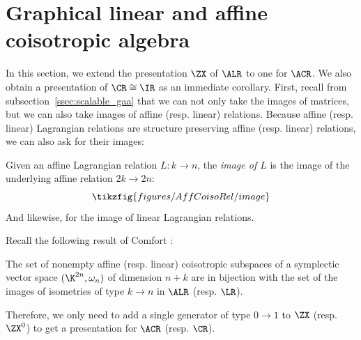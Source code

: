 \section{Graphical linear and affine coisotropic algebra}\label{sec:AffCoisoRel}
In this section, we extend the presentation \(\ZX\) of \(\ALR\) to one for  \(\ACR\).  We also obtain a presentation of \(\CR\cong\IR\) as an immediate corollary. 
First, recall from subsection~\ref{ssec:scalable_gaa} that we can not only take the images of matrices, but we can also take images of affine (resp. linear) relations.  Because affine (resp. linear) Lagrangian relations are structure preserving affine (resp. linear) relations, we can also ask for their images:
\begin{definition}
  Given an affine Lagrangian relation \(L:k\to n\), the {\em image of \(L\)} is the image of the underlying affine relation \(2k\to 2n\):
  \[\tikzfig{figures/AffCoisoRel/image}\]
  And likewise, for the image of linear Lagrangian relations.
\end{definition}
Recall the following result of Comfort \cite[Theorem 4.2]{comfort_algebra_2023}:
\begin{lemma}
  \label{lem:coisotropicimage}
  The set of nonempty affine (resp. linear) coisotropic subspaces of a symplectic vector space \((\K^{2n},\omega_n)\) of dimension \(n+k\) are in bijection with the set of the  images of isometries of type \(k\to n\) in \(\ALR\) (resp. \(\LR\)).
\end{lemma}
%
Therefore, we only need to add a single generator of type \(0\to 1\) to  \(\ZX\)  (resp. \(\ZX^0\)) to get a presentation for \(\ACR\) (resp. \(\CR\)).
